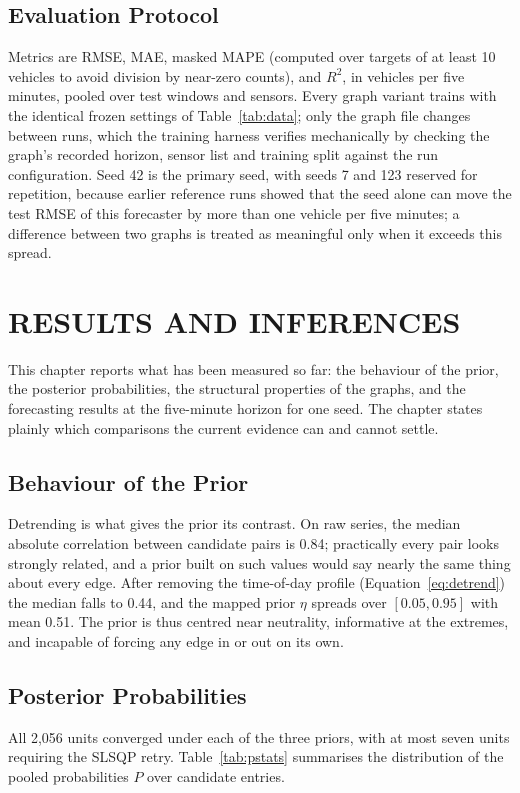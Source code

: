 \documentclass[MTech]{ugthesis}
\begin{document}
\section{Evaluation Protocol}
Metrics are \ac{RMSE}, \ac{MAE}, masked \ac{MAPE} (computed over targets of at least 10 vehicles to avoid division by near-zero counts), and $R^2$, in vehicles per five minutes, pooled over test windows and sensors. Every graph variant trains with the identical frozen settings of Table~\ref{tab:data}; only the graph file changes between runs, which the training harness verifies mechanically by checking the graph's recorded horizon, sensor list and training split against the run configuration. Seed 42 is the primary seed, with seeds 7 and 123 reserved for repetition, because earlier reference runs showed that the seed alone can move the test RMSE of this forecaster by more than one vehicle per five minutes; a difference between two graphs is treated as meaningful only when it exceeds this spread.

\chapter{RESULTS AND INFERENCES}
\label{chap:results}

This chapter reports what has been measured so far: the behaviour of the prior, the posterior probabilities, the structural properties of the graphs, and the forecasting results at the five-minute horizon for one seed. The chapter states plainly which comparisons the current evidence can and cannot settle.

\section{Behaviour of the Prior}
Detrending is what gives the prior its contrast. On raw series, the median absolute correlation between candidate pairs is 0.84; practically every pair looks strongly related, and a prior built on such values would say nearly the same thing about every edge. After removing the time-of-day profile (Equation~\eqref{eq:detrend}) the median falls to 0.44, and the mapped prior $\eta$ spreads over $[0.05, 0.95]$ with mean 0.51. The prior is thus centred near neutrality, informative at the extremes, and incapable of forcing any edge in or out on its own.

\section{Posterior Probabilities}
All 2,056 units converged under each of the three priors, with at most seven units requiring the SLSQP retry. Table~\ref{tab:pstats} summarises the distribution of the pooled probabilities $P$ over candidate entries.
\end{document}
